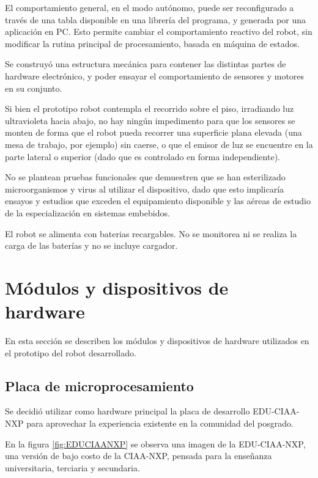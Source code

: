 El comportamiento general, en el modo autónomo, puede ser reconfigurado a través de una tabla disponible en una librería del programa, y generada por una aplicación en PC. Esto permite cambiar el comportamiento reactivo del robot, sin modificar la rutina principal de procesamiento, basada en máquina de estados.

Se construyó una estructura mecánica para contener las distintas partes de hardware electrónico, y poder ensayar el comportamiento de sensores y motores en su conjunto.

Si bien el prototipo robot contempla el recorrido sobre el piso, irradiando luz ultravioleta hacia abajo, no hay ningún impedimento para que los sensores se monten de forma que el robot pueda recorrer una superficie plana elevada (una mesa de trabajo, por ejemplo) sin caerse, o que el emisor de luz se encuentre en la parte lateral o superior (dado que es controlado en forma independiente).

No se plantean pruebas funcionales que demuestren que se han esterilizado microorganismos y virus al utilizar el dispositivo, dado que esto implicaría ensayos y estudios que exceden el equipamiento disponible y las aéreas de estudio de la especialización en sistemas embebidos.

El robot se alimenta con baterias recargables. No se  monitorea   ni se realiza la carga de las baterías y no se incluye cargador.

\section{Módulos y dispositivos de hardware}
En esta sección se describen los módulos y dispositivos de hardware utilizados en el prototipo del robot desarrollado.

\subsection{Placa de microprocesamiento}

Se decidió utilizar como hardware principal la placa de desarrollo EDU-CIAA-NXP \citep{EDUCIAA} para aprovechar la experiencia existente en la comunidad del posgrado.

En la figura \ref{fig:EDUCIAANXP} se observa una imagen de la EDU-CIAA-NXP, una versión de bajo costo de la CIAA-NXP, pensada para la enseñanza universitaria, terciaria y secundaria. 


